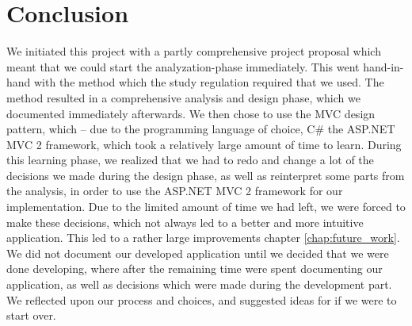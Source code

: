 \chapter{Conclusion}
\label{chap:conclusion}
We initiated this project with a partly comprehensive project proposal which meant that we could start the analyzation-phase immediately. This went hand-in-hand with the \ooad{} method which the study regulation required that we used. The \ooad{} method resulted in a comprehensive analysis and design phase, which we documented immediately afterwards. We then chose to use the MVC design pattern, which -- due to the programming language of choice, C\# the ASP.NET MVC 2 framework, which took a relatively large amount of time to learn. During this learning phase, we realized that we had to redo and change a lot of the decisions we made during the design phase, as well as reinterpret some parts from the analysis, in order to use the ASP.NET MVC 2 framework for our implementation. Due to the limited amount of time we had left, we were forced to make these decisions, which not always led to a better and more intuitive application. This led to a rather large improvements chapter \ref{chap:future_work}. We did not document our developed application until we decided that we were done developing, where after the remaining time were spent documenting our application, as well as decisions which were made during the development part. We reflected upon our process and choices, and suggested ideas for if we were to start over.










